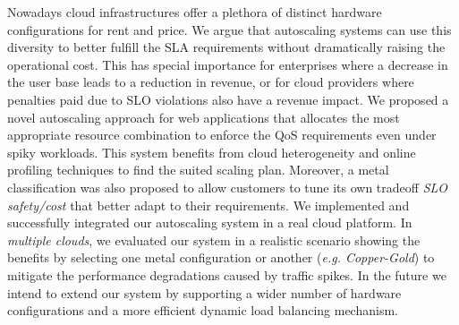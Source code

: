
Nowadays cloud infrastructures offer a plethora of distinct hardware configurations for rent and price. We argue that autoscaling systems can use this diversity to better fulfill the SLA requirements without dramatically raising the operational cost. This has special importance for enterprises where a decrease in the user base leads to a reduction in revenue, or for cloud providers where penalties paid due to SLO violations also have a revenue impact. We proposed a novel autoscaling approach for web applications that allocates the most appropriate resource combination to enforce the QoS requirements even under spiky workloads. This system benefits from cloud heterogeneity and online profiling techniques to find the suited scaling plan. Moreover, a metal classification was also proposed to allow customers to tune its own tradeoff \emph{SLO safety/cost} that better adapt to their requirements. We implemented and successfully integrated our autoscaling system in a real cloud platform. In \emph{multiple clouds}, we evaluated our system in a realistic scenario showing the benefits by selecting one metal configuration or another (\emph{e.g. Copper-Gold}) to mitigate the performance degradations caused by traffic spikes. In the future we intend to extend our system by supporting a wider number of hardware configurations and a more efficient dynamic load balancing mechanism. %









